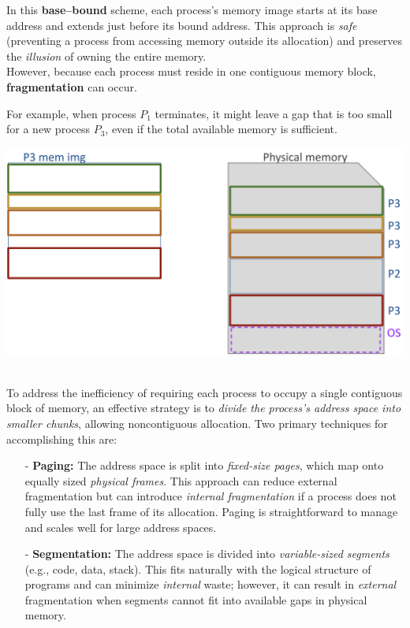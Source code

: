 \documentclass[../../compsys.tex]{subfiles}
\begin{document}
\noindent In this \textbf{base--bound} scheme, each process’s memory image starts at its base address and extends just before its bound address. This approach is \textit{safe} (preventing a process from accessing memory outside its allocation) and preserves the \textit{illusion} of owning the entire memory. \\[3px]

However, because each process must reside in one contiguous memory block, \textbf{fragmentation} can occur. \\[15px]
\noindent
\begin{minipage}{0.45\textwidth}
For example, when process \(P_1\) terminates, it might leave a gap that is too small for a new process \(P_3\), even if the total available memory is sufficient.
\end{minipage}%
\hfill
\vline
\hfill
\begin{minipage}{0.45\textwidth}
\begin{center}
  \includegraphics[width=1.25\textwidth]{chapters/L4/images/segmentation.png}
\end{center}
\end{minipage}
\\[20px]
\newpage
\noindent To address the inefficiency of requiring each process to occupy a single contiguous block of memory, an effective strategy is to \emph{divide the process’s address space into smaller chunks}, allowing noncontiguous allocation. Two primary techniques for accomplishing this are:
\vspace{10px}
\begin{itemize}
  \item[-] \textbf{Paging:} The address space is split into \emph{fixed-size pages}, which map onto equally sized \emph{physical frames}. This approach can reduce external fragmentation but can introduce \emph{internal fragmentation} if a process does not fully use the last frame of its allocation. Paging is straightforward to manage and scales well for large address spaces.
  \item[-] \textbf{Segmentation:} The address space is divided into \emph{variable-sized segments} (e.g., code, data, stack). This fits naturally with the logical structure of programs and can minimize \emph{internal} waste; however, it can result in \emph{external} fragmentation when segments cannot fit into available gaps in physical memory.
\end{itemize}
\end{document}
